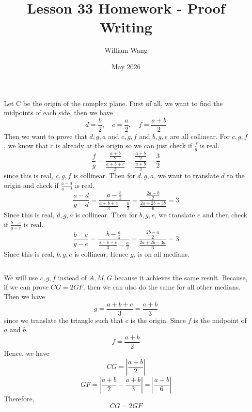 \documentclass{article}
\title{Lesson 33 Homework - Proof Writing}
\author{William Wang}
\date{May 2026}
\begin{document}
\maketitle

\section{}
\subsection{}
Let C be the origin of the complex plane. First of all, we want to find the midpoints of each side, then we have 
\[d = \frac{b}{2},\quad e = \frac{a}{2}, \quad f = \frac{a+b}{2}\]
Then we want to prove that \(d,g,a\) and \(c,g,f\) and \(b,g,e\) are all collinear. For \(c,g,f\), we know that \(c\) is already at the origin so we can just check if \(\frac{f}{g}\) is real. 
\[\frac{f}{g} = \frac{\frac{a+b}{2}}{\frac{a+b+c}{3}} = \frac{\frac{a+b}{2}}{\frac{a+b}{3}} = \frac{3}{2}\]
since this is real, \(c,g,f\) is collinear. Then for \(d,g,a\), we want to translate \(d\) to the origin and check if \(\frac{a-d}{g-d}\) is real. 
\[\frac{a-d}{g-d} = \frac{a-\frac{b}{2}}{\frac{a+b+c}{3} - \frac{b}{2}} = \frac{\frac{2a-b}{2}}{\frac{2a+2b-3b}{6}} = 3\]
Since this is real, \(d,g,a\) is collinear. Then for \(b,g,e\), we translate \(e\) and then check if \(\frac{b-e}{g-e}\) is real. 
\[\frac{b-e}{g-e} = \frac{b-\frac{a}{2}}{\frac{a+b+c}{3}-\frac{a}{2}} = \frac{\frac{2b-a}{2}}{\frac{2a+2b-3a}{6}} = 3\]
Since this is real, \(b,g,e\) is collinear. Hence \(g\), is on all medians. 


\subsection{}
We will use \(c,g,f\) instead of \(A,M,G\) because it achieves the same result. Because, if we can prove \(CG = 2GF\), then we can also do the same for all other medians. Then we have 
\[g = \frac{a+b+c}{3} = \frac{a+b}{3}\]
since we translate the triangle such that \(c\) is the origin. Since \(f\) is the midpoint of $a$ and $b$, 
\[f = \frac{a+b}{2}\]
Hence, we have 
\[CG = |\frac{a+b}{2}|\]
\[GF = |\frac{a+b}{2} - \frac{a+b}{3}| = |\frac{a+b}{6}|\]
Therefore, 
\[CG = 2GF\]
\end{document}
